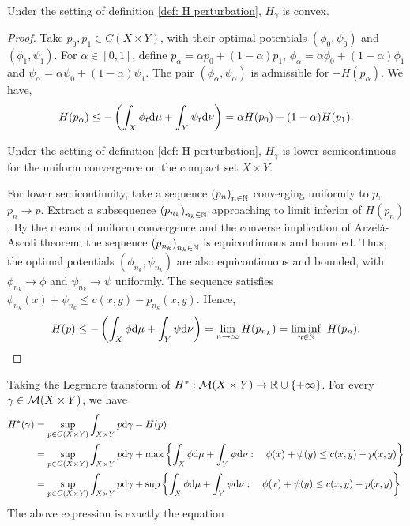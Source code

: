 \begin{lemma}
	Under the setting of definition \ref{def: H perturbation}, $H_\gamma$ is convex.
\end{lemma}
\begin{proof}
	Take $p_0, p_1 \in C(X\times Y)$,  with their optimal potentials $(\phi_0, \psi_0)$ and $(\phi_1, \psi_1)$. For $\alpha\in[0,1]$, define $p_\alpha=\alpha p_0+(1-\alpha)p_1$, $\phi_\alpha=\alpha \phi_0+(1-\alpha)\phi_1$ and $\psi_\alpha=\alpha \psi_0+(1-\alpha)\psi_1$. The pair $(\phi_\alpha, \psi_\alpha)$ is admissible for $-H(p_\alpha)$.
	We have,
	\begin{equation*}
		H(p_\alpha)\leq -\left( \int_X\phi_t\mathrm{d}\mu+\int_Y\psi_t\mathrm{d}\nu \right)=\alpha H(p_0)+(1-\alpha)H(p_1).
	\end{equation*}
\begin{lemma}
	Under the setting of definition \ref{def: H perturbation}, $H_\gamma$ is lower semicontinuous for the uniform convergence on the compact set $X\times Y$.
\end{lemma}
	For lower semicontinuity, take a sequence $\left( p_n \right)_{n\in\mathbb{N}}$ converging uniformly to $p$, $p_n\rightarrow p$. Extract a subsequence $\left( p_{n_k} \right)_{n_k\in\mathbb{N}}$ approaching to limit inferior of $H(p_n)$. By the means of uniform convergence and the converse implication of Arzel\`a-Ascoli theorem, the sequence $\left( p_{n_k} \right)_{n_k\in\mathbb{N}}$ is equicontinuous and bounded. 
	Thus, the optimal potentials $(\phi_{n_k}, \psi_{n_k})$ are also equicontinuous and bounded, with $\phi_{n_k}\rightarrow \phi$ and  $\psi_{n_k}\rightarrow \psi$ uniformly. The sequence satisfies $\phi_{n_k}(x)+\psi_{n_k}\leq c(x,y)-p_{n_k}(x,y)$.  Hence, 
	\begin{equation}
		H(p)\leq -\left( \int_X \phi\mathrm{d}\mu+\int_Y\psi\mathrm{d}\nu \right)=\lim_{n\rightarrow \infty}H(p_{n_k})=\liminf_{n\in\mathbb{N}}\ H(p_n).
	\end{equation}
\end{proof}
Taking the Legendre transform of $H^*:\mathcal{M}(X\times Y)\rightarrow \mathbb{R}\cup\left\lbrace +\infty \right\rbrace$. For every $\gamma\in \mathcal{M}(X\times Y)$, we have
\begin{align*}
	H^*(\gamma)&=\sup_{p\in C(X\times Y)}\int_{X\times Y}p\mathrm{d}\gamma -H(p)\\
	&=\sup_{p\in C(X\times Y)}\int_{X\times Y}p\mathrm{d}\gamma +\max\left\lbrace \int_X\phi \mathrm{d}\mu + \int_Y\psi \mathrm{d}\nu: \quad \phi(x)+\psi(y)\leq c(x,y)-p(x,y) \right\rbrace\\
	&=\sup_{p\in C(X\times Y)}\int_{X\times Y}p\mathrm{d}\gamma +\sup\left\lbrace \int_X\phi \mathrm{d}\mu + \int_Y\psi \mathrm{d}\nu: \quad \phi(x)+\psi(y)\leq c(x,y)-p(x,y) \right\rbrace
\end{align*}
The above expression is exactly the equation 
